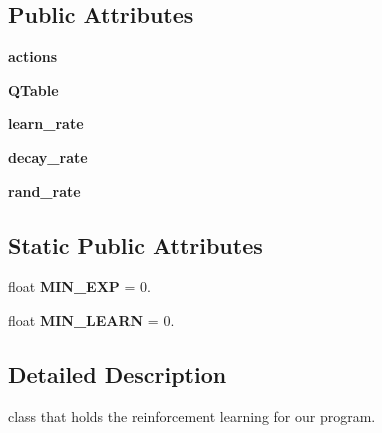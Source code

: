 \subsection*{Public Attributes}
\begin{DoxyCompactItemize}
\item 
{\bfseries actions}\hypertarget{classRLBrain_1_1RLBrain_afc5c3a7ca8959b8d9ae117f26ea6e3ce}{}\label{classRLBrain_1_1RLBrain_afc5c3a7ca8959b8d9ae117f26ea6e3ce}

\item 
{\bfseries Q\+Table}\hypertarget{classRLBrain_1_1RLBrain_a18b4f2777afa563eaa6989ab468e3192}{}\label{classRLBrain_1_1RLBrain_a18b4f2777afa563eaa6989ab468e3192}

\item 
{\bfseries learn\+\_\+rate}\hypertarget{classRLBrain_1_1RLBrain_a3b51c43b4123b2ba0dc6a5cfd300ebf3}{}\label{classRLBrain_1_1RLBrain_a3b51c43b4123b2ba0dc6a5cfd300ebf3}

\item 
{\bfseries decay\+\_\+rate}\hypertarget{classRLBrain_1_1RLBrain_abdfad2d282526a0e6211b17033b6c1ae}{}\label{classRLBrain_1_1RLBrain_abdfad2d282526a0e6211b17033b6c1ae}

\item 
{\bfseries rand\+\_\+rate}\hypertarget{classRLBrain_1_1RLBrain_aadeb48dfa9615e1fcad87e34f2aeb5c3}{}\label{classRLBrain_1_1RLBrain_aadeb48dfa9615e1fcad87e34f2aeb5c3}

\end{DoxyCompactItemize}
\subsection*{Static Public Attributes}
\begin{DoxyCompactItemize}
\item 
float {\bfseries M\+I\+N\+\_\+\+E\+XP} = 0.\hypertarget{classRLBrain_1_1RLBrain_a7a6679dda556a95a74c96a2b509b0a31}{}\label{classRLBrain_1_1RLBrain_a7a6679dda556a95a74c96a2b509b0a31}

\item 
float {\bfseries M\+I\+N\+\_\+\+L\+E\+A\+RN} = 0.\hypertarget{classRLBrain_1_1RLBrain_a122ac433b266b7b98100f554851e14e6}{}\label{classRLBrain_1_1RLBrain_a122ac433b266b7b98100f554851e14e6}

\end{DoxyCompactItemize}


\subsection{Detailed Description}
class that holds the reinforcement learning for our program. 

